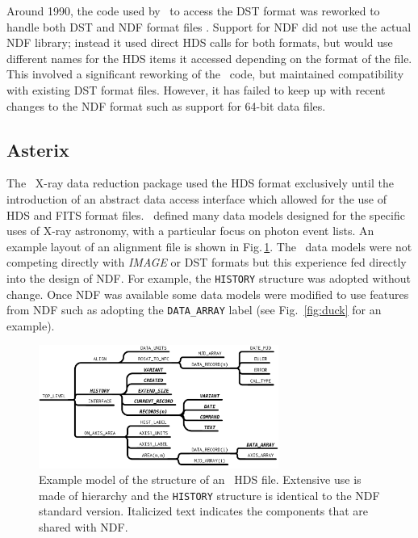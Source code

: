 \documentclass[final,authoryear,5p,times,twocolumn]{elsarticle}
\begin{document}
Around 1990, the code used by \figaro\ to access the DST format was
reworked to handle both DST and NDF format files
\citep{1990STARB...6...18S}. Support for NDF did
not use the actual NDF library; instead it used direct HDS calls for
both formats, but would use different names for the HDS items it
accessed depending on the format of the file. This involved a
significant reworking of the \figaro\ code, but maintained compatibility
with existing DST format files. However, it has failed to keep up with
recent changes to the NDF format such as support for 64-bit data
files.

\subsection{Asterix}
\label{app:asterix}

The \asterix\ X-ray data reduction package
\citep[][]{1987JBIS...40..185P,SUN98,1992STARB...9....3S} used the HDS
format exclusively until the introduction of an abstract data access
interface \citep{1995ASPC...77..199A} which allowed for the use of HDS
and FITS format files. \asterix\ defined many data models designed for
the specific uses of X-ray astronomy, with a particular focus on
photon event lists. An example layout of an alignment file is shown in
Fig.\,\ref{fig:asterix}. The \asterix\ data models were not competing directly with \emph{IMAGE} or
DST formats but this experience fed directly into the design of NDF.
For example, the \texttt{HISTORY} structure was adopted without change. Once
NDF was available some data models were modified to use features from
NDF such as adopting the \texttt{DATA\_ARRAY} label (see
Fig.~\ref{fig:duck} for an example).

\begin{figure}[t]
\begin{center}
\includegraphics[width=0.7\textwidth]{model-asterix}
\end{center}
\caption{Example model of the structure of an \asterix\ HDS
  file. Extensive use is made of hierarchy and the \texttt{HISTORY}
  structure is identical to the NDF standard version. Italicized text
  indicates the components that are shared with NDF.}
\label{fig:asterix}
\end{figure}
\end{document}
